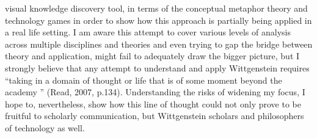visual knowledge discovery tool, in terms of the conceptual
metaphor theory and technology games in order to show how this
approach is partially being applied in a real life setting. I am aware
this attempt to cover various levels of analysis across multiple
disciplines and theories and even trying to gap the bridge between
theory and application, might fail to adequately draw the bigger
picture, but I strongly believe that any attempt to understand and apply
Wittgenstein requires “taking in a domain of thought or life that is of
some moment beyond the academy ” (Read, 2007, p.134).
Understanding the risks of widening my focus, I hope to, nevertheless,
show how this line of thought could not only prove to be fruitful to
scholarly communication, but Wittgenstein scholars and philosophers of
technology as well.
